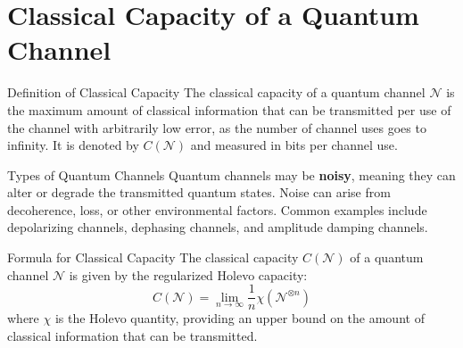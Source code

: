 \section{Classical Capacity of a Quantum Channel}

\begin{frame}{Definition of Classical Capacity}
The classical capacity of a quantum channel \( \mathcal{N} \) is the maximum amount of classical information that can be transmitted per use of the channel with arbitrarily low error, as the number of channel uses goes to infinity. It is denoted by \( C(\mathcal{N}) \) and measured in bits per channel use.
\end{frame}

\begin{frame}{Types of Quantum Channels}
Quantum channels may be \textbf{noisy}, meaning they can alter or degrade the transmitted quantum states. Noise can arise from decoherence, loss, or other environmental factors. Common examples include depolarizing channels, dephasing channels, and amplitude damping channels.
\end{frame}

\begin{frame}{Formula for Classical Capacity}
The classical capacity \( C(\mathcal{N}) \) of a quantum channel \( \mathcal{N} \) is given by the regularized Holevo capacity:
\begin{equation}
    C(\mathcal{N}) = \lim_{n \to \infty} \frac{1}{n} \chi\left(\mathcal{N}^{\otimes n}\right)
\end{equation}
where \( \chi \) is the Holevo quantity, providing an upper bound on the amount of classical information that can be transmitted.
\end{frame}
